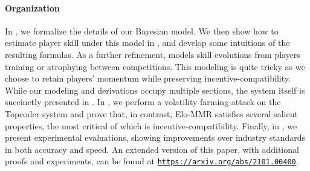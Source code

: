 \paragraph{Organization}
In , we formalize the details of our Bayesian model. We then show how to estimate player skill under this model in , and develop some intuitions of the resulting formulas. As a further refinement,  models skill evolutions from players training or atrophying between competitions. This modeling is quite tricky as we choose to retain players' momentum while preserving incentive-compatibility. While our modeling and derivations occupy multiple sections, the system itself is succinctly presented in . In , we perform a volatility farming attack on the Topcoder system and prove that, in contrast, Elo-MMR satisfies several salient properties, the most critical of which is incentive-compatibility. Finally, in , we present experimental evaluations, showing improvements over industry standards in both accuracy and speed. An extended version of this paper, with additional proofs and experiments, can be found at {\tt\url{https://arxiv.org/abs/2101.00400}}.